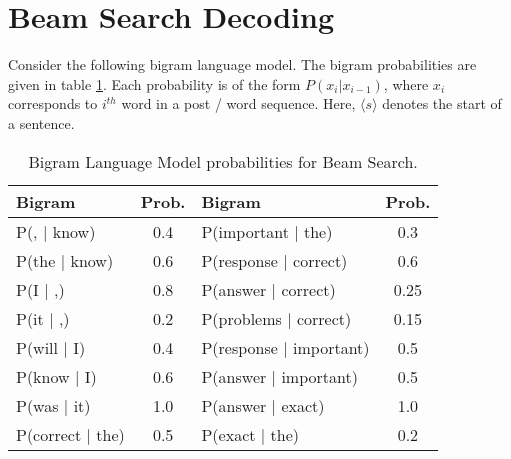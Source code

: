 \documentclass[11pt, letterpaper]{article}
\begin{document}
\newpage

\section{Beam Search Decoding}
Consider the following bigram language model. The bigram probabilities are given in table \ref{tab:bigram_prob}. Each probability is of the form $P(x_i|x_{i-1})$, where $x_i$ corresponds to $i^{th}$ word in a post / word sequence. Here, $\langle s \rangle$ denotes the start of a sentence.

\begin{table}[h!]
    \centering
    \begin{tabular}{|l|c|l|c|}
    \toprule
        Bigram & Prob. & Bigram & Prob.\\
        \hline
        P(, $|$ know) & 0.4 & P(important $|$ the) & 0.3 \\
        P(the $|$ know) & 0.6 & P(response $|$ correct) & 0.6 \\
        P(I $|$ ,) & 0.8 & P(answer $|$ correct) & 0.25  \\
        P(it $|$ ,) & 0.2 & P(problems $|$ correct) & 0.15  \\
        P(will $|$ I) & 0.4 & P(response $|$ important) & 0.5 \\
        P(know $|$ I) & 0.6 & P(answer $|$ important) & 0.5\\
        P(was $|$ it) & 1.0 & P(answer $|$ exact) & 1.0 \\
        P(correct $|$ the) & 0.5 &  P(exact $|$ the) & 0.2 \\
    \bottomrule
    \end{tabular}
    \caption{Bigram Language Model probabilities for Beam Search.}
    \label{tab:bigram_prob}
\end{table}
\end{document}
